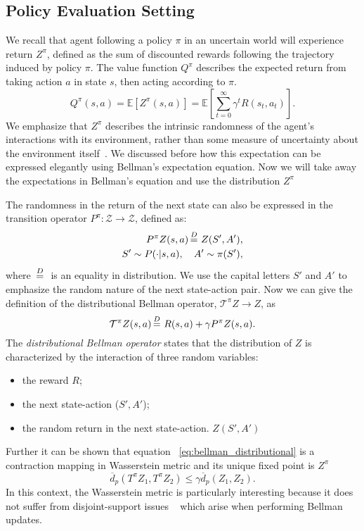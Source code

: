 \subsection{Policy Evaluation Setting}
We recall that agent following a policy $\pi$ in an uncertain world will experience return $Z^\pi$, defined as the sum of discounted rewards following the trajectory induced by policy $\pi$. The value function $Q^\pi$  describes the expected return  from taking  action $a$  in state $s$, then acting according to $\pi$.
\begin{equation*}
	Q^\pi(s,a)=\mathbb{E}\left[Z^\pi(s,a)\right]=\mathbb{E}\left[\sum_{t=0}^{\infty} \gamma^{t}R(s_t,a_t) \right].
\end{equation*}
We emphasize that $Z^\pi$ describes the intrinsic randomness of the agent's interactions with its environment, rather than some measure of uncertainty about the environment itself~\cite{DBLP:journals/corr/BellemareDM17}. We discussed before how this expectation can be expressed elegantly using Bellman's expectation equation. Now we will take away the expectations in Bellman's equation and use the distribution $Z^\pi$\par
The randomness in the return of the next state can also be expressed in the transition operator $P^\pi: \mathcal{Z \rightarrow Z}$, defined as:
\begin{equation}
\begin{aligned}
	P^\pi Z(s,a) \,{\buildrel D \over =}\ Z(S',A'), \\
	S' \sim P(\cdot |s,a), \quad A' \sim \pi(S'),
\end{aligned}
\end{equation} 
where $\,{\buildrel D \over =}\ $ is an equality in distribution. We use the capital letters $S'$ and $A'$ to emphasize the random nature of the next state-action pair. Now we can give the definition of the distributional Bellman operator, $\mathcal{T}^\pi Z \rightarrow Z$, as 
\begin{equation}
	\mathcal{T}^\pi Z(s,a) \,{\buildrel D \over =}\ R(s,a)+ \gamma P^\pi Z(s,a).
	\label{eq:bellman_distributional}
\end{equation} 
The \emph{distributional Bellman operator} states that the distribution of $Z$ is characterized by the interaction of three random variables: 
\begin{itemize}
	\item the reward $R$;
	\item the next state-action ($S',A'$);
	\item the random return in the next state-action. $Z(S',A')$
\end{itemize}
Further it can be shown that equation ~\ref{eq:bellman_distributional} is a contraction mapping in Wasserstein metric and its unique fixed point is $Z^\pi$~\cite{DBLP:journals/corr/BellemareDM17} 
\begin{equation}
	\overline{d}_p(T^{\pi}Z_1,T^{\pi}Z_2) \leq \gamma \overline{d}_p(Z_1,Z_2).
\end{equation}
In  this  context,  the  Wasserstein metric is particularly interesting because it does not suffer from disjoint-support issues ~\cite{pmlr-v70-arjovsky17a} which  arise  when  performing  Bellman  updates.
